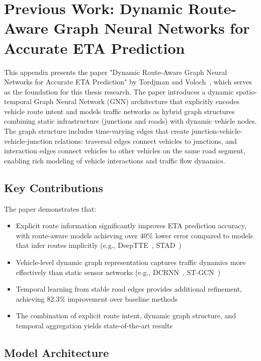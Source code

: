 \appendix

\section{Previous Work: Dynamic Route-Aware Graph Neural Networks for Accurate ETA Prediction}

This appendix presents the paper "Dynamic Route-Aware Graph Neural Networks for Accurate ETA Prediction" by Tordjman and Voloch~\cite{Tordjman2025DSTRA}, which serves as the foundation for this thesis research. The paper introduces a dynamic spatio-temporal Graph Neural Network (GNN) architecture that explicitly encodes vehicle route intent and models traffic networks as hybrid graph structures combining static infrastructure (junctions and roads) with dynamic vehicle nodes. The graph structure includes time-varying edges that create junction-vehicle-vehicle-junction relations: traversal edges connect vehicles to junctions, and interaction edges connect vehicles to other vehicles on the same road segment, enabling rich modeling of vehicle interactions and traffic flow dynamics.

\subsection{Key Contributions}

The paper demonstrates that:
\begin{itemize}
    \item Explicit route information significantly improves ETA prediction accuracy, with route-aware models achieving over 40\% lower error compared to models that infer routes implicitly (e.g., DeepTTE~\cite{deepTTE2018}, STAD~\cite{abbar2020stad})
    \item Vehicle-level dynamic graph representation captures traffic dynamics more effectively than static sensor networks (e.g., DCRNN~\cite{dcrnn2018}, ST-GCN~\cite{yu2018stgcn})
    \item Temporal learning from stable road edges provides additional refinement, achieving 82.3\% improvement over baseline methods
    \item The combination of explicit route intent, dynamic graph structure, and temporal aggregation yields state-of-the-art results
\end{itemize}

\subsection{Model Architecture}

